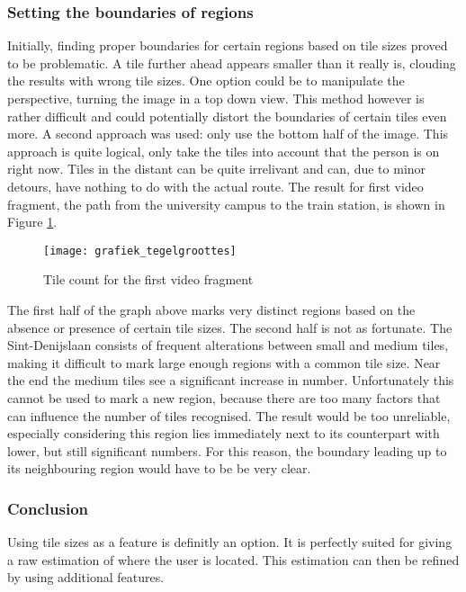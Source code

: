 \subsubsection{Setting the boundaries of regions}
Initially, finding proper boundaries for certain regions based on tile sizes proved to be problematic. A tile further ahead appears smaller than it really is, clouding the results with wrong tile sizes. One option could be to manipulate the perspective, turning the image in a top down view. This method however is rather difficult and could potentially distort the boundaries of certain tiles even more. A second approach was used: only use the bottom half of the image.  This approach is quite logical, only take the tiles into account that the person is on right now. Tiles in the distant can be quite irrelivant and can, due to minor detours, have nothing to do with the actual route. The result for first video fragment, the path from the university campus to the train station, is shown in Figure \ref{grafiek_tegelgroottes}.

\begin{figure}[ht]
\centering
  \texttt{[image: grafiek\_tegelgroottes]}
  \caption{Tile count for the first video fragment\label{grafiek_tegelgroottes}}
\end{figure}
The first half of the graph above marks very distinct regions based on the absence or presence of certain tile sizes. The second half is not as fortunate. The Sint-Denijslaan consists of frequent alterations between small and medium tiles, making it difficult to mark large enough regions with a common tile size. Near the end the medium tiles see a significant increase in number. Unfortunately this cannot be used to mark a new region, because there are too many factors that can influence the number of tiles recognised. The result would be too unreliable, especially considering this region lies immediately next to its counterpart with lower, but still significant numbers. For this reason, the boundary leading up to its neighbouring region would have to be be very clear.  

\subsubsection{Conclusion}
Using tile sizes as a feature is definitly an option. It is perfectly suited for giving a raw estimation of where the user is located. This estimation can then be refined by using additional features.
\clearpage
